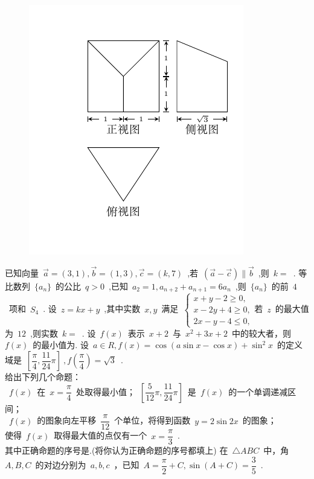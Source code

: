 \documentclass[printbox]{BHCexam}
\begin{document}
\begin{questions}
\begin{figure}[!htb]
\begin{minipage}[t]{0.5\textwidth}
\includegraphics[scale=0.9]{sanshitu.pdf}
\end{minipage}  
\end{figure}
\vspace{-2cm}
\tiankong
\question 已知向量~$\vec{a}=(3,1),\vec{b}=(1,3),\vec{c}=(k,7)$~,若~$(\vec{a}-\vec{c}) \parallel \vec{b}$~,则~$k=$~\mtk{}.
\question 等比数列~$\{a_n \}$~的公比~$q>0$~,已知~$a_2=1,a_{n+2}+a_{n+1}=6a_n$~,则~$\{a_n \}$~的前~$4$~项和~$S_4$~\mtk{}.
\question 设~$z=kx+y$~,其中实数~$x,y$~满足~$ \begin{cases}
x+y-2\geq 0,\\
x-2y+4\geq 0, \\
2x-y-4\leq 0,
\end{cases}$若~$z$~的最大值为~$12$~,则实数~$k=$~\mtk{}.
\question 设~$f(x)$~表示~$x+2$~与~$x^2+3x+2$~中的较大者，则~$f(x)$~的最小值为\mtk{}.
\question 设~$a\in R,f(x)=\cos (a\sin x-\cos x)+\sin ^2 x$~的定义域是~$\left[ \dfrac{\pi}{4},\dfrac{11}{24} \pi \right]~,f(\dfrac{\pi}{4})=\sqrt{3}$~.\\给出下列几个命题：\\
~$f(x)$~在~$x=\dfrac{\pi}{4}$~处取得最小值；~$\left[ \dfrac{5}{12} \pi,\dfrac{11}{24} \pi \right]$~是~$f(x)$~的一个单调递减区间；\\
~$f(x)$~的图象向左平移~$\dfrac{\pi}{12}$~个单位，将得到函数~$y=2\sin {2x}$~的图象；\\
使得~$f(x)$~取得最大值的点仅有一个~$x=\dfrac{\pi}{3}$~.\\
其中正确命题的序号是\mtk{}.(将你认为正确命题的序号都填上)
\jianda
\question 在~$\triangle ABC$~中，角~$A,B,C$~的对边分别为~$a,b,c$~，已知~$A=\dfrac{\pi}{2}+C,\sin (A+C)=\dfrac{3}{5}$~.
\begin{parts}

\end{parts}
\end{questions}
\end{document}
